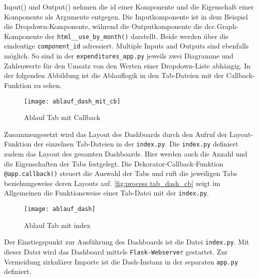     Input() und Output() nehmen die id einer Komponente und die Eigenschaft einer Komponente als Argumente entgegen.
    Die Inputkomponente ist in dem Beispiel die Dropdown-Komponente, während die Outputkomponente die dcc.Graph-Komponente der
    \texttt{html\_\_use\_by\_month()} darstellt. Beide werden über die eindeutige \texttt{component\_id} adressiert.
    Multiple Inputs and Outputs sind ebenfalls möglich. So sind in der \texttt{expenditures\_app.py}
    jeweils zwei Diagramme und Zahlenwerte für den Umsatz von den Werten einer Dropdown-Liste abhängig.
    In der folgenden Abbildung ist die Ablauflogik in den Tab-Dateien mit der Callback-Funktion zu sehen.

    \begin{figure}[H]
        \centering
            \texttt{[image: ablauf\_dash\_mit\_cb]}
            \caption{Ablauf Tab mit Callback}
            \label{fig:process tab_dash_cb}
    \end{figure}


    Zusammengesetzt wird das Layout des Dashboards durch den Aufruf der Layout-Funktion der einzelnen Tab-Dateien in der \texttt{index.py}.
    Die \texttt{index.py} definiert zudem das Layout des gesamten Dashboards. Hier werden auch die Anzahl und die Eigenschaften der Tabs festgelegt. 
    Die Dekorator-Callback-Funktion \texttt{@app.callback()} steuert die Auswahl der Tabs und ruft die jeweiligen Tabs beziehungsweise deren 
    Layouts auf. \autoref{fig:process tab_dash_cb} zeigt im Allgemeinen die Funktionsweise einer Tab-Datei mit der \texttt{index.py}.

    \begin{figure}[H]
        \centering
            \texttt{[image: ablauf\_dash]}
            \caption{Ablauf Tab mit index}
            \label{fig:process tab_dash_cb}
    \end{figure}

    Der Einstiegspunkt zur Ausführung des Dashboards ist die Datei \texttt{index.py}. Mit dieser Datei wird das Dashboard mittels \texttt{Flask-Webserver}
    gestartet. Zur Vermeidung zirkulärer Importe ist die Dash-Instanz in der separaten \texttt{app.py} definiert\cite[vgl.][]{plotly_url_2021}.


